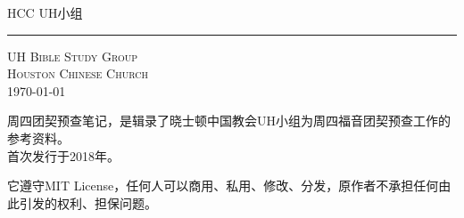 \documentclass[Chinese]{CKBib}
\newcommand{\FormedWidth}{\paperwidth}
\newcommand{\FormedHeight}{\paperheight}
\newcommand{\Includepage}[2]{}
\begin{document}
\mainmatter

\thispagestyle{empty}
\pagestyle{empty}
\Includepage{-}{cover.pdf}

\clearpage

\thispagestyle{empty}
\pagestyle{empty}

\begin{center}

\vspace*{0.2in}

\LARGE \SansF HCC UH小组

\vspace*{0.13in}

\HUGE {}

\vspace*{0.18in}

\hrule

\vspace*{0.18in}

\Large 
\begin{minipage}{\textwidth}
\end{minipage}

\normalsize

\vspace*{0.68in}

\scshape UH Bible Study Group\\
Houston Chinese Church\\
\upshape \today
\end{center}

\clearpage

\begin{footnotesize}

\noindent 周四团契预查笔记，是辑录了晓士顿中国教会UH小组为周四福音团契预查工作的参考资料。\\
首次发行于2018年。

\vspace{1em}

\noindent 它遵守MIT License，任何人可以商用、私用、修改、分发，原作者不承担任何由此引发的权利、担保问题。

\end{footnotesize}
\end{document}
